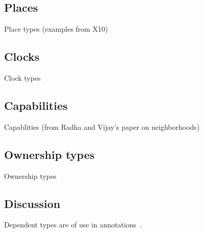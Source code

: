 \cite{gps06-arrays}

\subsection{Places}

Place types (examples from X10)

\subsection{Clocks}

Clock types

\subsection{Capabilities}

Capablities (from Radha and Vijay's paper on neighborhoods)

\subsection{Ownership types}

Ownership types~\cite{ownership-types}

\subsection{Discussion}

Dependent types are of use in annotations~\cite{ns07-x10anno}.
